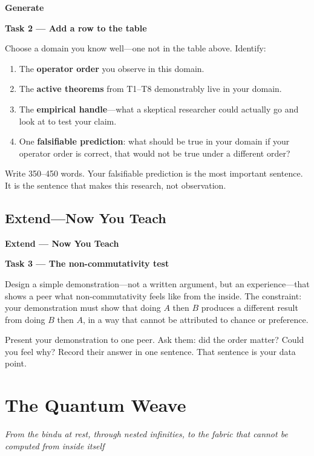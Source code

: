 \documentclass[11pt, twoside, openright]{book}
\theoremstyle{plain}
\theoremstyle{definition}
\newenvironment{generatebox}{%
  \begin{mdframed}[backgroundcolor=GenerateBox,linecolor=red!50!black,linewidth=0.5pt,innertopmargin=6pt,innerbottommargin=6pt]
  \noindent\textbf{Generate}\par\medskip}{\end{mdframed}}
\newenvironment{extendbox}{%
  \begin{mdframed}[backgroundcolor=ExtendBox,linecolor=violet!70,linewidth=0.5pt,innertopmargin=6pt,innerbottommargin=6pt]
  \noindent\textbf{Extend --- Now You Teach}\par\medskip}{\end{mdframed}}
\begin{document}
\begin{generatebox}
\textbf{Task 2 --- Add a row to the table}

Choose a domain you know well---one not in the table above.
Identify:
\begin{enumerate}[label=\arabic*.]
  \item The \textbf{operator order} you observe in this domain.
  \item The \textbf{active theorems} from T1--T8 demonstrably live in your domain.
  \item The \textbf{empirical handle}---what a skeptical researcher
    could actually go and look at to test your claim.
  \item One \textbf{falsifiable prediction}: what should be true in
    your domain if your operator order is correct, that would not be
    true under a different order?
\end{enumerate}

Write 350--450 words. Your falsifiable prediction is the most important
sentence. It is the sentence that makes this research, not observation.
\end{generatebox}

\section{Extend---Now You Teach}

\begin{extendbox}
\textbf{Task 3 --- The non-commutativity test}

Design a simple demonstration---not a written argument, but an
experience---that shows a peer what non-commutativity feels like from
the inside. The constraint: your demonstration must show that doing $A$
then $B$ produces a different result from doing $B$ then $A$, in a way
that cannot be attributed to chance or preference.

Present your demonstration to one peer. Ask them: did the order matter?
Could you feel why? Record their answer in one sentence. That sentence
is your data point.
\end{extendbox}

\chapter{The Quantum Weave}
\textit{From the bindu at rest, through nested infinities,
to the fabric that cannot be computed from inside itself}
\end{document}
